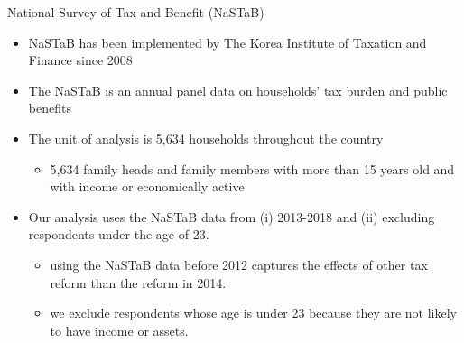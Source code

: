 \documentclass[
  ignorenonframetext,
  aspectratio=169,
]{beamer}
\providecommand{\tightlist}{%
  \setlength{\itemsep}{0pt}\setlength{\parskip}{0pt}}
\begin{document}
\begin{frame}{National Survey of Tax and Benefit (NaSTaB)}
\protect\hypertarget{national-survey-of-tax-and-benefit-nastab}{}
\begin{itemize}
\tightlist
\item
  NaSTaB has been implemented by The Korea Institute of Taxation and Finance since 2008
\item
  The NaSTaB is an annual panel data on households' tax burden and public benefits
\item
  The unit of analysis is 5,634 households throughout the country

  \begin{itemize}
  \tightlist
  \item
    5,634 family heads and family members with more than 15 years old and with income or economically active
  \end{itemize}
\item
  Our analysis uses the NaSTaB data from (i) 2013-2018 and (ii) excluding respondents under the age of 23.

  \begin{itemize}
  \tightlist
  \item
    using the NaSTaB data before 2012 captures the effects of other tax reform than the reform in 2014.
  \item
    we exclude respondents whose age is under 23 because they are not likely to have income or assets.
  \end{itemize}
\end{itemize}
\end{frame}
\end{document}
